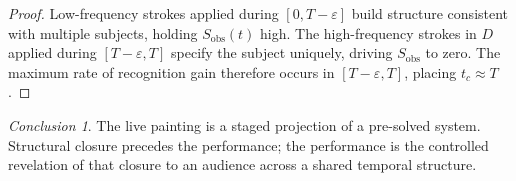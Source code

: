 \documentclass[12pt, twoside]{article}
\theoremstyle{plain}
\theoremstyle{definition}
\theoremstyle{remark}
\newtheorem{conclusion}[theorem]{Conclusion}
\begin{document}
\begin{proof}
Low-frequency strokes applied during $[0, T - \varepsilon]$ build structure consistent with multiple subjects, holding $S_{\text{obs}}(t)$ high. The high-frequency strokes in $D$ applied during $[T - \varepsilon, T]$ specify the subject uniquely, driving $S_{\text{obs}}$ to zero. The maximum rate of recognition gain therefore occurs in $[T - \varepsilon, T]$, placing $t_c \approx T$.
\end{proof}

\begin{conclusion}
The live painting is a staged projection of a pre-solved system. Structural closure precedes the performance; the performance is the controlled revelation of that closure to an audience across a shared temporal structure.
\end{conclusion}


\newpage

\end{document}
